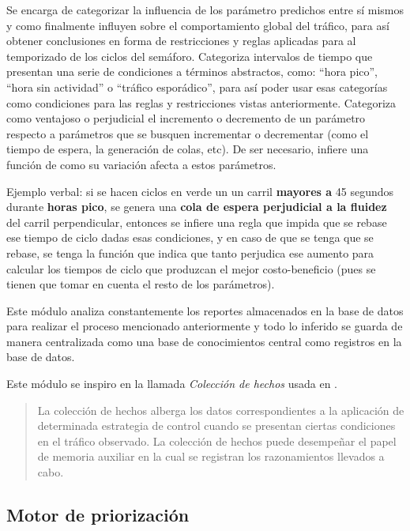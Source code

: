 Se encarga de categorizar la influencia de los parámetro predichos entre
sí mismos y como finalmente influyen sobre el comportamiento global del
tráfico, para así obtener conclusiones en forma de restricciones y
reglas aplicadas para al temporizado de los ciclos del semáforo.
Categoriza intervalos de tiempo que presentan una serie de condiciones a
términos abstractos, como: ``hora pico'', ``hora sin actividad'' o
``tráfico esporádico'', para así poder usar esas categorías como
condiciones para las reglas y restricciones vistas anteriormente.
Categoriza como ventajoso o perjudicial el incremento o decremento de un
parámetro respecto a parámetros que se busquen incrementar o decrementar
(como el tiempo de espera, la generación de colas, etc). De ser
necesario, infiere una función de como su variación afecta a estos
parámetros.

Ejemplo verbal: si se hacen ciclos en verde un un carril \textbf{mayores
a} 45 segundos durante \textbf{horas pico}, se genera una \textbf{cola
de espera perjudicial a la fluidez} del carril perpendicular, entonces
se infiere una regla que impida que se rebase ese tiempo de ciclo dadas
esas condiciones, y en caso de que se tenga que se rebase, se tenga la
función que indica que tanto perjudica ese aumento para calcular los
tiempos de ciclo que produzcan el mejor costo-beneficio (pues se tienen
que tomar en cuenta el resto de los parámetros).

Este módulo analiza constantemente los reportes almacenados en la base
de datos para realizar el proceso mencionado anteriormente y todo lo
inferido se guarda de manera centralizada como una base de conocimientos
central como registros en la base de datos.

Este módulo se inspiro en la llamada \emph{Colección de hechos} usada en
\textcite{JoelTrejo2006}.

\begin{quote}
La colección de hechos alberga los datos correspondientes a la
aplicación de determinada estrategia de control cuando se presentan
ciertas condiciones en el tráfico observado. La colección de hechos
puede desempeñar el papel de memoria auxiliar en la cual se registran
los razonamientos llevados a cabo. \textcite[p. 47]{JoelTrejo2006}
\end{quote}

\hypertarget{motor-de-priorizaciuxf3n}{%
\subsection{Motor de priorización}\label{motor-de-priorizaciuxf3n}}

